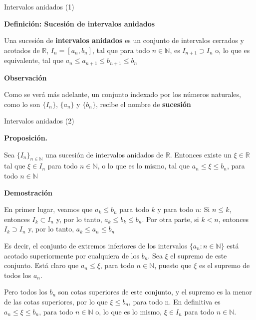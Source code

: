 \documentclass[ignorenonframetext,]{beamer}
\begin{document}
\begin{frame}{Intervalos anidados (1)}
\protect\hypertarget{intervalos-anidados-1}{}

 \textbf{Definición: Sucesión de intervalos anidados}

Una sucesión de \textbf{intervalos anidados} es un conjunto de
intervalos cerrados y acotados de \(\mathbb{R}\), \(I_n = [a_n,b_n]\),
tal que para todo \(n \in \mathbb{N}\), es \(I_{n+1} \supset I_n\) o, lo
que es equivalente, tal que \(a_n \leq a_{n+1} \leq b_{n+1} \leq b_n\)

 \textbf{Observación}

Como se verá más adelante, un conjunto indexado por los números
naturales, como lo son \(\{I_n\}\), \(\{a_n\}\) y \(\{b_n\}\), recibe el
nombre de \textbf{sucesión}

\end{frame}

\begin{frame}{Intervalos anidados (2)}
\protect\hypertarget{intervalos-anidados-2}{}

 \textbf{Proposición.}

Sea \(\{I_n\}_{n \in \mathbb{N}}\) una sucesión de intervalos anidados
de \(\mathbb{R}\). Entonces existe un \(\xi \in \mathbb{R}\) tal que
\(\xi \in I_n\) para todo \(n \in \mathbb{N}\), o lo que es lo mismo,
tal que \(a_n \leq \xi \leq b_n\), para todo \(n \in \mathbb{N}\)

\textbf{Demostración}

En primer lugar, veamos que \(a_k \leq b_n\) para todo \(k\) y para todo
\(n\): Si \(n \leq k\), entonces \(I_k \subset I_n\) y, por lo tanto,
\(a_k \leq b_k \leq b_n\). Por otra parte, si \(k < n\), entonces
\(I_k \supset I_n\) y, por lo tanto, \(a_k \leq a_n \leq b_n\)

Es decir, el conjunto de extremos inferiores de los intervalos
\(\{a_n: n \in \mathbb{N}\}\) está acotado superiormente por cualquiera
de los \(b_n\). Sea \(\xi\) el supremo de este conjunto. Está claro que
\(a_n \leq \xi\), para todo \(n \in \mathbb{N}\), puesto que \(\xi\) es
el supremo de todos los \(a_n\).

Pero todos los \(b_n\) son cotas superiores de este conjunto, y el
supremo es la menor de las cotas superiores, por lo que
\(\xi \leq b_n\), para todo n. En definitiva es
\(a_n \leq \xi \leq b_n\), para todo \(n \in \mathbb{N}\) o, lo que es
lo mismo, \(\xi \in I_n\) para todo \(n \in \mathbb{N}\).

\end{frame}
\end{document}
